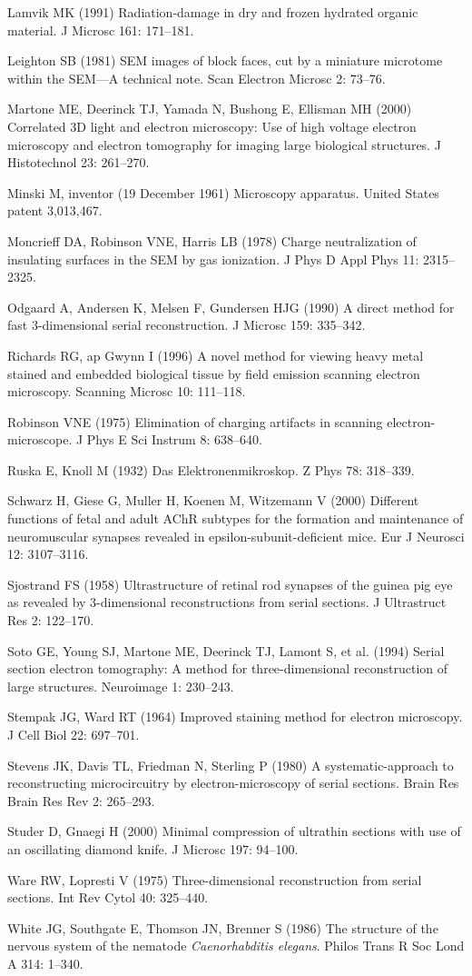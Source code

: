 \documentclass{article}
\begin{document}
\begin{hangpars}
Lamvik MK (1991) Radiation-damage in dry and frozen hydrated organic material. J Microsc 161: 171–181.

Leighton SB (1981) SEM images of block faces, cut by a miniature microtome within the SEM—A technical note. Scan Electron Microsc 2: 73–76.

Martone ME, Deerinck TJ, Yamada N, Bushong E, Ellisman MH (2000) Correlated 3D light and electron microscopy: Use of high voltage electron microscopy and electron tomography for imaging large biological structures. J Histotechnol 23: 261–270.

Minski M, inventor (19 December 1961) Microscopy apparatus. United States patent 3,013,467.

Moncrieff DA, Robinson VNE, Harris LB (1978) Charge neutralization of insulating surfaces in the SEM by gas ionization. J Phys D Appl Phys 11: 2315–2325.

Odgaard A, Andersen K, Melsen F, Gundersen HJG (1990) A direct method for fast 3-dimensional serial reconstruction. J Microsc 159: 335–342.

Richards RG, ap Gwynn I (1996) A novel method for viewing heavy metal stained and embedded biological tissue by field emission scanning electron microscopy. Scanning Microsc 10: 111–118.

Robinson VNE (1975) Elimination of charging artifacts in scanning electron-microscope. J Phys E Sci Instrum 8: 638–640.

Ruska E, Knoll M (1932) Das Elektronenmikroskop. Z Phys 78: 318–339.

Schwarz H, Giese G, Muller H, Koenen M, Witzemann V (2000) Different functions of fetal and adult AChR subtypes for the formation and maintenance of neuromuscular synapses revealed in epsilon-subunit-deficient mice. Eur J Neurosci 12: 3107–3116.

Sjostrand FS (1958) Ultrastructure of retinal rod synapses of the guinea pig eye as revealed by 3-dimensional reconstructions from serial sections. J Ultrastruct Res 2: 122–170.

Soto GE, Young SJ, Martone ME, Deerinck TJ, Lamont S, et al. (1994) Serial section electron tomography: A method for three-dimensional reconstruction of large structures. Neuroimage 1: 230–243.

Stempak JG, Ward RT (1964) Improved staining method for electron microscopy. J Cell Biol 22: 697–701.

Stevens JK, Davis TL, Friedman N, Sterling P (1980) A systematic-approach to reconstructing microcircuitry by electron-microscopy of serial sections. Brain Res Brain Res Rev 2: 265–293.

Studer D, Gnaegi H (2000) Minimal compression of ultrathin sections with use of an oscillating diamond knife. J Microsc 197: 94–100.

Ware RW, Lopresti V (1975) Three-dimensional reconstruction from serial sections. Int Rev Cytol 40: 325–440.

White JG, Southgate E, Thomson JN, Brenner S (1986) The structure of the nervous system of the nematode \emph{Caenorhabditis elegans}. Philos Trans R Soc Lond A 314: 1–340.
\end{hangpars}
\end{document}

